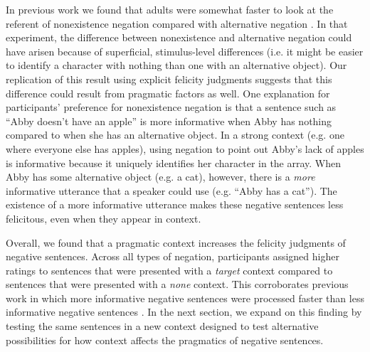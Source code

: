 \documentclass[10pt,letterpaper]{article}
\begin{document}
In previous work we found that adults were somewhat faster to look at the referent of nonexistence negation compared with alternative negation \cite{nordmeyer2014b}. In that experiment, the difference between nonexistence and alternative negation could have arisen because of superficial, stimulus-level differences (i.e. it might be easier to identify a character with nothing than one with an alternative object). Our replication of this result using explicit felicity judgments suggests that this difference could result from pragmatic factors as well. One explanation for participants' preference for nonexistence negation is that a sentence such as ``Abby doesn't have an apple'' is more informative when Abby has nothing compared to when she has an alternative object.  In a strong context (e.g. one where everyone else has apples), using negation to point out Abby's lack of apples is informative because it uniquely identifies her character in the array.  When Abby has some alternative object (e.g. a cat), however, there is a \emph{more} informative utterance that a speaker could use (e.g. ``Abby has a cat'').  The existence of a more informative utterance makes these negative sentences less felicitous, even when they appear in context.

Overall, we found that a pragmatic context increases the felicity judgments of negative sentences.  Across all types of negation, participants assigned higher ratings to sentences that were presented with a \emph{target} context compared to sentences that were presented with a \emph{none} context.  This corroborates previous work in which more informative negative sentences were processed faster than less informative negative sentences \cite{nordmeyer2014}.  In the next section, we expand on this finding by testing the same sentences in a new context designed to test alternative possibilities for how context affects the pragmatics of negative sentences.
\end{document}
